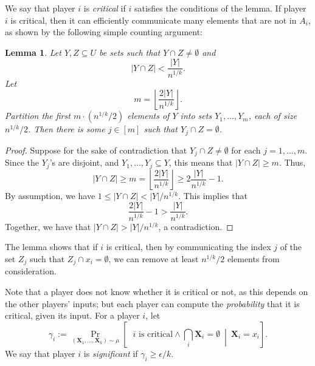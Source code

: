 \documentclass{article}
\newcommand{\coloneq}{:=}
\newcommand{\eps}{\epsilon}
\newcommand{\given}{\medspace \middle| \medspace}
\newcommand{\rv}[1]{\mathbf{#1}}
\theoremstyle{plain}
\newtheorem{lemma}[theorem]{Lemma}
\begin{document}
We say that player $i$ is \emph{critical} if $i$ satisfies the conditions of the lemma.
If player $i$ is critical, then it can efficiently communicate many elements that are not in $A_i$, as shown
by the following simple counting argument:
\begin{lemma}
  Let $Y,Z \subseteq U$ be sets such that $Y \cap Z \neq \emptyset$ and
  \begin{equation*}
    |Y \cap Z| < \frac{|Y|}{n^{1/k}}.
  \end{equation*}
  Let
  \begin{equation*}
    m = \left\lfloor \frac{2|Y|}{n^{1/k}} \right\rfloor.
  \end{equation*}
  Partition the first $m \cdot (n^{1/k}/2)$ elements of $Y$ into sets $Y_1,\ldots,Y_m$,
  each of size $n^{1/k}/2$.
  Then there is some $j \in [m]$ such that $Y_j \cap Z = \emptyset$.
  \label{lemma:reduce}
\end{lemma}  
\begin{proof}
  Suppose for the sake of contradiction that $Y_j \cap Z \neq \emptyset$ for each $j = 1,\ldots,m$.
  Since the $Y_j$'s are disjoint,
  and $Y_1,\ldots,Y_j \subseteq Y$,
  this means that $|Y \cap Z| \geq m$.
  Thus,
  \begin{equation*}
    |Y \cap Z| \geq m = \left\lfloor \frac{2|Y|}{n^{1/k}} \right\rfloor
    \geq
    2\frac{|Y|}{n^{1/k}} - 1.
  \end{equation*}
  By assumption, we have $1 \leq |Y \cap Z| < |Y| / n^{1/k}$.
  This implies that
  \begin{equation*}
    \frac{2|Y|}{n^{1/k}} - 1 > \frac{|Y|}{n^{1/k}}.
  \end{equation*}
  Together, we have that $|Y \cap Z| > |Y| / n^{1/k}$, a contradiction.
\end{proof}
The lemma shows that if $i$ is critical, then by communicating the index $j$ of the set $Z_j$ such that $Z_j \cap x_i = \emptyset$,
we can remove at least $n^{1/k}/2$ elements from consideration.

Note that a player does not know whether it is critical or not, as this depends 
on the other players' inputs;
but each player can compute the \emph{probability} that it is critical, given its input.
For a player $i$,
let
\begin{equation*}
  \gamma_i \coloneq \Pr_{(\rv{X}_1,\ldots,\rv{X}_k) \sim \mu}\left[ \text{ $i$ is critical} \land \bigcap_i \rv{X}_i = \emptyset \given \rv{X}_i = x_i \right].
\end{equation*}
We say that player $i$ is \emph{significant} if $\gamma_i \geq \eps / k$.
\end{document}
